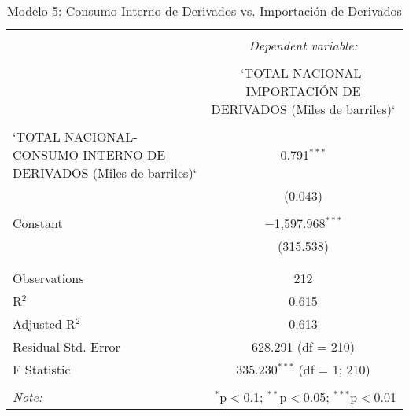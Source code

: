 
\begin{table}[!htbp] \centering 
  \caption{Modelo 5: Consumo Interno de Derivados vs. Importación de Derivados} 
  \label{} 
\begin{tabular}{@{\extracolsep{5pt}}lc} 
\\[-1.8ex]\hline 
\hline \\[-1.8ex] 
 & \multicolumn{1}{c}{\textit{Dependent variable:}} \\ 
\cline{2-2} 
\\[-1.8ex] & `TOTAL NACIONAL-IMPORTACIÓN DE DERIVADOS (Miles de barriles)` \\ 
\hline \\[-1.8ex] 
 `TOTAL NACIONAL-CONSUMO INTERNO DE DERIVADOS (Miles de barriles)` & 0.791$^{***}$ \\ 
  & (0.043) \\ 
  & \\ 
 Constant & $-$1,597.968$^{***}$ \\ 
  & (315.538) \\ 
  & \\ 
\hline \\[-1.8ex] 
Observations & 212 \\ 
R$^{2}$ & 0.615 \\ 
Adjusted R$^{2}$ & 0.613 \\ 
Residual Std. Error & 628.291 (df = 210) \\ 
F Statistic & 335.230$^{***}$ (df = 1; 210) \\ 
\hline 
\hline \\[-1.8ex] 
\textit{Note:}  & \multicolumn{1}{r}{$^{*}$p$<$0.1; $^{**}$p$<$0.05; $^{***}$p$<$0.01} \\ 
\end{tabular} 
\end{table} 

